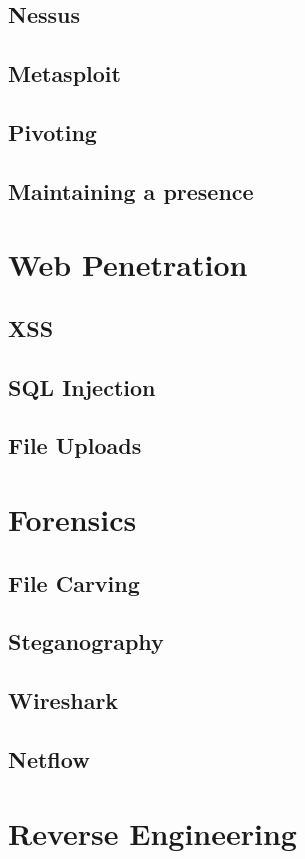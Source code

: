 \documentclass[a4paper,11pt]{report}
\begin{document}
	\section{Nessus}
	\section{Metasploit}
	\section{Pivoting}
	\section{Maintaining a presence}
\chapter{Web Penetration}
	\label{ch:WebPenetration}
	\section{XSS}
	\section{SQL Injection}
	\section{File Uploads}
\chapter{Forensics}
	\label{ch:Forensics}
	\section{File Carving}
	\section{Steganography}
	\section{Wireshark}
	\section{Netflow}
\chapter{Reverse Engineering}
	\label{ch:ReverseEngineering}
\end{document}
